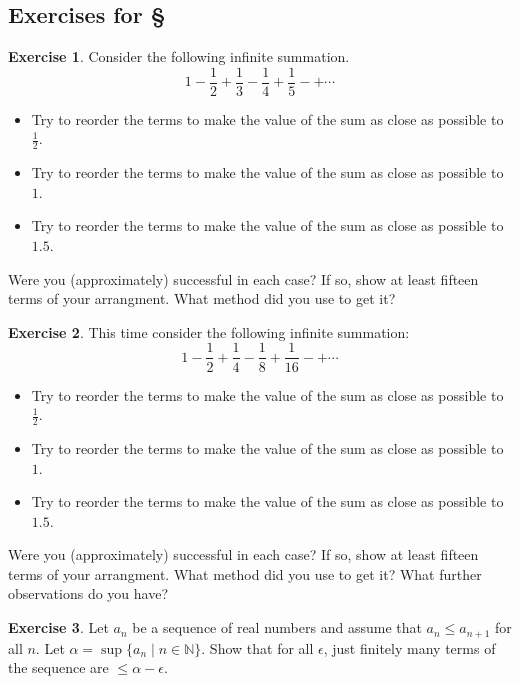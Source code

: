 \documentclass[11pt,oneside]{amsbook}
\newcommand{\set}[1]{\left\{\,#1\,\right\}}
\newcommand{\NN}{\mathbb N}
\theoremstyle{definition}
\newtheorem{exerc}{Exercise}[section]
\theoremstyle{plain}
\theoremstyle{definition}
\theoremstyle{remark}
\numberwithin{equation}{section}
\numberwithin{figure}{section}
\begin{document}
\newpage
\subsection*{Exercises for \S \thesection}

\begin{exerc}
  Consider the following infinite summation.
  \[1-\frac12+\frac13-\frac14+\frac15-+\cdots
  \]
  \begin{itemize}
    \item Try to reorder the terms to make the value of the sum as close as possible to $\frac12$.
    \item Try to reorder the terms to make the value of the sum as close as possible to $1$.
    \item Try to reorder the terms to make the value of the sum as close as possible to $1.5$.
  \end{itemize}
  Were you (approximately) successful in each case? If so, show at least fifteen terms of your arrangment. What method did you use to get it?
\end{exerc}

\begin{exerc}
  This time consider the following infinite summation:
  \[1-\frac12+\frac14-\frac18+\frac{1}{16}-+\cdots
  \]
  \begin{itemize}
    \item Try to reorder the terms to make the value of the sum as close as possible to $\frac12$.
    \item Try to reorder the terms to make the value of the sum as close as possible to $1$.
    \item Try to reorder the terms to make the value of the sum as close as possible to $1.5$.
  \end{itemize}
  Were you (approximately) successful in each case? If so, show at least fifteen terms of your arrangment. What method did you use to get it? What further observations do you have?
\end{exerc}


\begin{exerc}
  Let $a_n$ be a sequence of real numbers and assume that $a_n\leq a_{n+1}$ for all $n$. Let $\alpha=\sup\{a_n\mid n\in\NN\}$. Show that for all $\epsilon$, just finitely many terms of the sequence are $\leq\alpha-\epsilon$.
\end{exerc}
\end{document}
